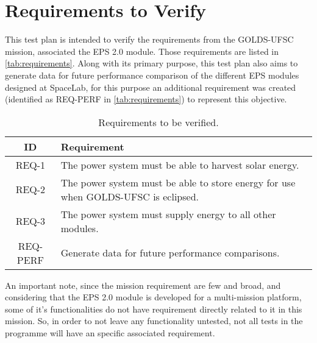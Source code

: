 %
%
%
%
%

%
%
%
%
%

\chapter{Requirements to Verify} \label{ch:srequirements}

This test plan is intended to verify the requirements from the GOLDS-UFSC mission, associated the EPS 
2.0 module.
Those requirements are listed in \autoref{tab:requirements}.
Along with its primary purpose, this test plan also aims to generate data for future performance comparison of the different EPS modules designed at SpaceLab, for this purpose an additional requirement was created (identified as REQ-PERF in \autoref{tab:requirements}) to represent this objective.

\begin{table}[htp]
    \centering
    \begin{tabular}{c p{105mm}}
        \toprule
        \textbf{ID} & \textbf{Requirement} \\
        \midrule
        \midrule
        REQ-1    & The power system must be able to harvest solar energy. \\
        REQ-2    & The power system must be able to store energy for use when GOLDS-UFSC is eclipsed. \\
        REQ-3    & The power system must supply energy to all other modules. \\
        REQ-PERF & Generate data for future performance comparisons. \\
        \bottomrule
    \end{tabular}
    \caption{Requirements to be verified.}
    \label{tab:requirements}
\end{table}

An important note, since the mission requirement are few and broad, and considering that the EPS 2.0 module is developed for a multi-mission platform, some of it's functionalities do not have requirement directly related to it in this mission. So, in order to not leave any functionality untested, not all tests in the programme will have an specific associated requirement.